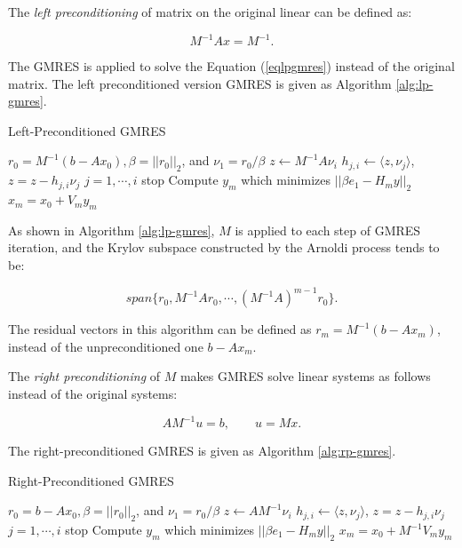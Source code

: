 {The \textit{left preconditioning} of matrix on the original linear can be defined as:

\begin{equation}
\label{eqlpgmres}
M^{-1}Ax=    M^{-1}.
\end{equation}

The GMRES is applied to solve the Equation (\ref{eqlpgmres}) instead of the original matrix. The left preconditioned version GMRES is given as Algorithm \ref{alg:lp-gmres}.

\begin{algorithm}[htbp]
	\caption{Left-Preconditioned GMRES}
	\label{alg:lp-gmres}
	\begin{algorithmic}[1]
		\State $r_0=M^{-1}(b-A x_0), \beta=||r_0||_2$, and $\nu_1=r_0/\beta$
		\State $z \leftarrow M^{-1}A\nu_i$
		\State $h_{j,i} \leftarrow \langle z,\nu_j\rangle$, $z = z- h_{j,i}\nu_j$ $j=1,\cdots,i$
		\State stop
		\Else
		\EndIf
		\EndFor
		\State Compute $y_m$ which minimizes $||\beta e_1-H_m y||_2$ 
		\State $x_m=x_0+V_my_m$
	\end{algorithmic}
\end{algorithm}

As shown in Algorithm \ref{alg:lp-gmres}, $M$ is applied to each step of GMRES iteration, and the Krylov subspace constructed by the Arnoldi process tends to be:

\begin{equation}
span\{r_0, M^{-1}Ar_0, \cdots, (M^{-1}A)^{m-1}r_0\}.
\end{equation}

The residual vectors in this algorithm can be defined as $r_m=M^{-1}(b-Ax_m)$, instead of the unpreconditioned one $b-Ax_m$.

The \textit{right preconditioning} of $M$ makes GMRES solve linear systems as follows instead of the original systems:

\begin{equation}
AM^{-1}u=b, \qquad u = Mx.
\end{equation}

The right-preconditioned GMRES is given as Algorithm \ref{alg:rp-gmres}.

\begin{algorithm}[htbp]
	\caption{Right-Preconditioned GMRES}
	\label{alg:rp-gmres}
	\begin{algorithmic}[1]
		\State $r_0=b-A x_0, \beta=||r_0||_2$, and $\nu_1=r_0/\beta$
		\State $z \leftarrow AM^{-1}\nu_i$
		\State $h_{j,i} \leftarrow \langle z,\nu_j\rangle$, $z = z- h_{j,i}\nu_j$ $j=1,\cdots,i$
		\State stop
		\Else
		\EndIf
		\EndFor
		\State Compute $y_m$ which minimizes $||\beta e_1-H_m y||_2$ 
		\State $x_m=x_0+M^{-1}V_my_m$
	\end{algorithmic}
\end{algorithm}

}

